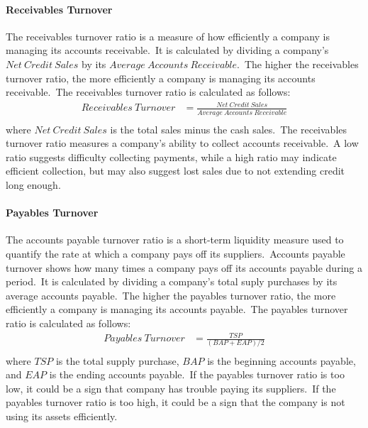 \documentclass[../xlapes02]{subfiles}
\begin{document}
    \paragraph{Receivables Turnover}\label{par:receivables-turnover}
    The receivables turnover ratio is a measure of how efficiently a company is managing its accounts receivable.\ It is calculated by dividing a company's $Net\ Credit\ Sales$ by its $Average\ Accounts\ Receivable$.\ The higher the receivables turnover ratio, the more efficiently a company is managing its accounts receivable.\ The receivables turnover ratio is calculated as follows:
    \begin{equation}
        \label{eq:receivables-turnover}
        \begin{split}
            Receivables\ Turnover&=\frac{Net\ Credit\ Sales}{Average\ Accounts\ Receivable}\\
        \end{split}
    \end{equation}
    where $Net\ Credit\ Sales$ is the total sales minus the cash sales.\ The receivables turnover ratio measures a company's ability to collect accounts receivable.\ A low ratio suggests difficulty collecting payments, while a high ratio may indicate efficient collection, but may also suggest lost sales due to not extending credit long enough.

    \paragraph{Payables Turnover}\label{par:payables-turnover}
    The accounts payable turnover ratio is a short-term liquidity measure used to quantify the rate at which a company pays off its suppliers.\ Accounts payable turnover shows how many times a company pays off its accounts payable during a period.\ It is calculated by dividing a company's total suply purchases by its average accounts payable.\ The higher the payables turnover ratio, the more efficiently a company is managing its accounts payable.\ The payables turnover ratio is calculated as follows:
    \begin{equation}
        \label{eq:payables-turnover}
        \begin{split}
            Payables\ Turnover&=\frac{TSP}{(BAP+EAP)/2}\\
        \end{split}
    \end{equation}
    where $TSP$ is the total supply purchase, $BAP$ is the beginning accounts payable, and $EAP$ is the ending accounts payable.\ If the payables turnover ratio is too low, it could be a sign that company has trouble paying its suppliers.\ If the payables turnover ratio is too high, it could be a sign that the company is not using its assets efficiently.
\end{document}
